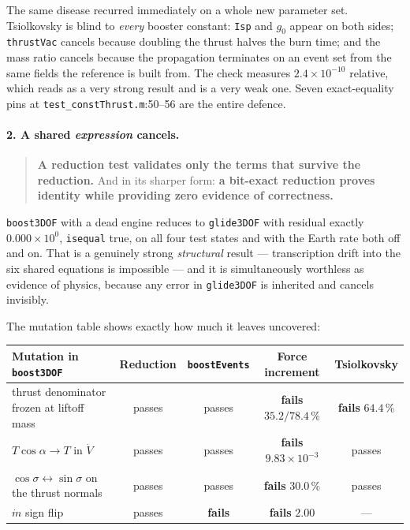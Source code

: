 \documentclass[11pt]{article}
\newcommand{\code}[1]{\texttt{#1}}
\begin{document}
The same disease recurred immediately on a whole new parameter set.
Tsiolkovsky is blind to \emph{every} booster constant: \code{Isp} and $g_0$
appear on both sides; \code{thrustVac} cancels because doubling the thrust
halves the burn time; and the mass ratio cancels because the propagation
terminates on an event set from the same fields the reference is built from.
The check measures $2.4\times10^{-10}$ relative, which reads as a very strong
result and is a very weak one. Seven exact-equality pins at
\code{test\_constThrust.m}:50--56 are the entire defence.

\paragraph{2. A shared \emph{expression} cancels.}

\begin{quote}
\textbf{A reduction test validates only the terms that survive the reduction.}
And in its sharper form: \textbf{a bit-exact reduction proves identity while
providing zero evidence of correctness.}
\end{quote}

\code{boost3DOF} with a dead engine reduces to \code{glide3DOF} with residual
exactly $0.000\times10^{0}$, \code{isequal} true, on all four test states and
with the Earth rate both off and on. That is a genuinely strong
\emph{structural} result --- transcription drift into the six shared equations
is impossible --- and it is simultaneously worthless as evidence of physics,
because any error in \code{glide3DOF} is inherited and cancels invisibly.

The mutation table shows exactly how much it leaves uncovered:

\begin{center}
\begin{tabular}{lcccc}
\toprule
Mutation in \code{boost3DOF} & Reduction & \code{boostEvents} & Force increment & Tsiolkovsky \\
\midrule
thrust denominator frozen at liftoff mass & passes & passes & \textbf{fails} $35.2/78.4\,\%$ & \textbf{fails} $64.4\,\%$ \\
$T\cos\alpha \to T$ in $\dot V$           & passes & passes & \textbf{fails} $9.83\times10^{-3}$ & passes \\
$\cos\sigma \leftrightarrow \sin\sigma$ on the thrust normals & passes & passes & \textbf{fails} $30.0\,\%$ & passes \\
$\dot m$ sign flip                        & passes & \textbf{fails} & \textbf{fails} $2.00$ & --- \\
\bottomrule
\end{tabular}
\end{center}
\end{document}
